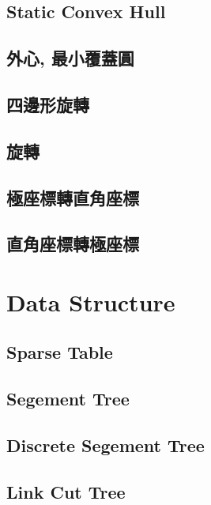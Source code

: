 \subsection{Static Convex Hull} 

\subsection{外心, 最小覆蓋圓} 

\subsection{四邊形旋轉} 

\subsection{旋轉} 

\subsection{極座標轉直角座標}

\subsection{直角座標轉極座標}


\section{Data Structure}
\subsection{Sparse Table}

\subsection{Segement Tree}

\subsection{Discrete Segement Tree}

\subsection{Link Cut Tree}

